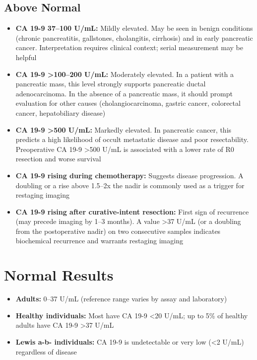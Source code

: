 \subsection*{Above Normal}
\begin{itemize}
  \item \textbf{CA 19-9 37--100 U/mL:} Mildly elevated. May be seen in benign conditions (chronic pancreatitis, gallstones, cholangitis, cirrhosis) and in early pancreatic cancer. Interpretation requires clinical context; serial measurement may be helpful
  \item \textbf{CA 19-9 >100--200 U/mL:} Moderately elevated. In a patient with a pancreatic mass, this level strongly supports pancreatic ductal adenocarcinoma. In the absence of a pancreatic mass, it should prompt evaluation for other causes (cholangiocarcinoma, gastric cancer, colorectal cancer, hepatobiliary disease)
  \item \textbf{CA 19-9 >500 U/mL:} Markedly elevated. In pancreatic cancer, this predicts a high likelihood of occult metastatic disease and poor resectability. Preoperative CA 19-9 >500 U/mL is associated with a lower rate of R0 resection and worse survival
  \item \textbf{CA 19-9 rising during chemotherapy:} Suggests disease progression. A doubling or a rise above 1.5--2x the nadir is commonly used as a trigger for restaging imaging
  \item \textbf{CA 19-9 rising after curative-intent resection:} First sign of recurrence (may precede imaging by 1--3 months). A value >37 U/mL (or a doubling from the postoperative nadir) on two consecutive samples indicates biochemical recurrence and warrants restaging imaging
\end{itemize}

\section*{Normal Results}
\begin{itemize}
  \item \textbf{Adults:} 0--37 U/mL (reference range varies by assay and laboratory)
  \item \textbf{Healthy individuals:} Most have CA 19-9 <20 U/mL; up to 5\% of healthy adults have CA 19-9 >37 U/mL
  \item \textbf{Lewis a-b- individuals:} CA 19-9 is undetectable or very low (<2 U/mL) regardless of disease
\end{itemize}


